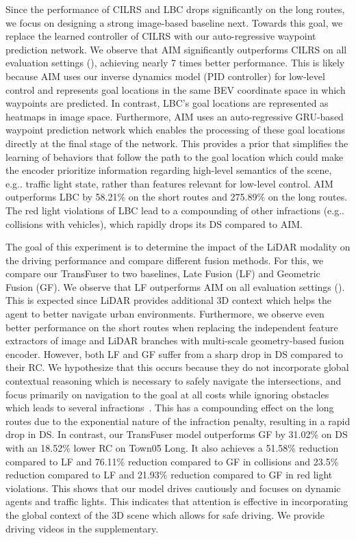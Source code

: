 \documentclass[final]{cvpr}
\makeatletter
\DeclareRobustCommand\onedot{\futurelet\@let@token\@onedot}
\def\@onedot{\ifx\@let@token.\else.\null\fi\xspace}
\def\eg{e.g\onedot} \def\Eg{E.g\onedot}
\newcommand{\boldparagraph}[1]{\vspace{0.1cm}\noindent{\bf #1:}}
\makeatother
\begin{document}
\boldparagraph{AIM is a strong baseline} Since the performance of CILRS and LBC drops significantly on the long routes, we focus on designing a strong image-based baseline next. Towards this goal, we replace the learned controller of CILRS with our auto-regressive waypoint prediction network. We observe that AIM significantly outperforms CILRS on all evaluation settings (), achieving nearly 7 times better performance. This is likely because AIM uses our inverse dynamics model (PID controller) for low-level control and represents goal locations in the same BEV coordinate space in which waypoints are predicted. In contrast, LBC's goal locations are represented as heatmaps in image space. Furthermore, AIM uses an auto-regressive GRU-based waypoint prediction network which enables the processing of these goal locations directly at the final stage of the network. This provides a prior that simplifies the learning of behaviors that follow the path to the goal location which could make the encoder prioritize information regarding high-level semantics of the scene, \eg traffic light state, rather than features relevant for low-level control. AIM outperforms LBC by 58.21\% on the short routes and 275.89\% on the long routes. The red light violations of LBC lead to a compounding of other infractions (\eg collisions with vehicles), which rapidly drops its DS compared to AIM.

\boldparagraph{Sensor Fusion Methods} The goal of this experiment is to determine the impact of the LiDAR modality on the driving performance and compare different fusion methods. For this, we compare our TransFuser to two baselines, Late Fusion (LF) and Geometric Fusion (GF). We observe that LF outperforms AIM on all evaluation settings (). This is expected since LiDAR provides additional 3D context which helps the agent to better navigate urban environments. Furthermore, we observe even better performance on the short routes when replacing the independent feature extractors of image and LiDAR branches with multi-scale geometry-based fusion encoder. However, both LF and GF suffer from a sharp drop in DS compared to their RC. We hypothesize that this occurs because they do not incorporate global contextual reasoning which is necessary to safely navigate the intersections, and focus primarily on navigation to the goal at all costs while ignoring obstacles which leads to several infractions~. This has a compounding effect on the long routes due to the exponential nature of the infraction penalty, resulting in a rapid drop in DS. In contrast, our TransFuser model outperforms GF by 31.02\% on DS with an 18.52\% lower RC on Town05 Long. It also achieves a 51.58\% reduction compared to LF and 76.11\% reduction compared to GF in collisions and 23.5\% reduction compared to LF and 21.93\% reduction compared to GF in red light violations. This shows that our model drives cautiously and focuses on dynamic agents and traffic lights. This indicates that attention is effective in incorporating the global context of the 3D scene which allows for safe driving. We provide driving videos in the supplementary.
\end{document}
